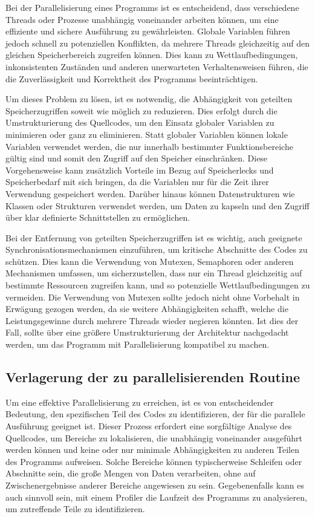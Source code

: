 Bei der Parallelisierung eines Programms ist es entscheidend, dass verschiedene Threads oder Prozesse unabhängig voneinander arbeiten können, um eine effiziente und sichere Ausführung zu gewährleisten. Globale Variablen führen jedoch schnell zu potenziellen Konflikten, da mehrere Threads gleichzeitig auf den gleichen Speicherbereich zugreifen können. Dies kann zu Wettlaufbedingungen, inkonsistenten Zuständen und anderen unerwarteten Verhaltensweisen führen, die die Zuverlässigkeit und Korrektheit des Programms beeinträchtigen.

Um dieses Problem zu lösen, ist es notwendig, die Abhängigkeit von geteilten Speicherzugriffen soweit wie möglich zu reduzieren. Dies erfolgt durch die Umstrukturierung des Quellcodes, um den Einsatz globaler Variablen zu minimieren oder ganz zu eliminieren. Statt globaler Variablen können lokale Variablen verwendet werden, die nur innerhalb bestimmter Funktionsbereiche gültig sind und somit den Zugriff auf den Speicher einschränken. Diese Vorgehensweise kann zusätzlich Vorteile im Bezug auf Speicherlecks und Speicherbedarf mit sich bringen, da die Variablen nur für die Zeit ihrer Verwendung gespeichert werden. Darüber hinaus können Datenstrukturen wie Klassen oder Strukturen verwendet werden, um Daten zu kapseln und den Zugriff über klar definierte Schnittstellen zu ermöglichen.

Bei der Entfernung von geteilten Speicherzugriffen ist es wichtig, auch geeignete Synchronisationsmechanismen einzuführen, um kritische Abschnitte des Codes zu schützen. Dies kann die Verwendung von Mutexen, Semaphoren oder anderen Mechanismen umfassen, um sicherzustellen, dass nur ein Thread gleichzeitig auf bestimmte Ressourcen zugreifen kann, und so potenzielle Wettlaufbedingungen zu vermeiden. Die Verwendung von Mutexen sollte jedoch nicht ohne Vorbehalt in Erwägung gezogen werden, da sie weitere Abhängigkeiten schafft, welche die Leistungsgewinne durch mehrere Threads wieder negieren könnten. Ist dies der Fall, sollte über eine größere Umstrukturierung der Architektur nachgedacht werden, um das Programm mit Parallelisierung kompatibel zu machen.

\subsection{Verlagerung der zu parallelisierenden Routine}
\label{sec:Verlagerung_parallelisierende_Routine}
Um eine effektive Parallelisierung zu erreichen, ist es von entscheidender Bedeutung, den spezifischen Teil des Codes zu identifizieren, der für die parallele Ausführung geeignet ist. Dieser Prozess erfordert eine sorgfältige Analyse des Quellcodes, um Bereiche zu lokalisieren, die unabhängig voneinander ausgeführt werden können und keine oder nur minimale Abhängigkeiten zu anderen Teilen des Programms aufweisen. Solche Bereiche können typischerweise Schleifen oder Abschnitte sein, die große Mengen von Daten verarbeiten, ohne auf Zwischenergebnisse anderer Bereiche angewiesen zu sein. Gegebenenfalls kann es auch sinnvoll sein, mit einem Profiler die Laufzeit des Programms zu analysieren, um zutreffende Teile zu identifizieren.

